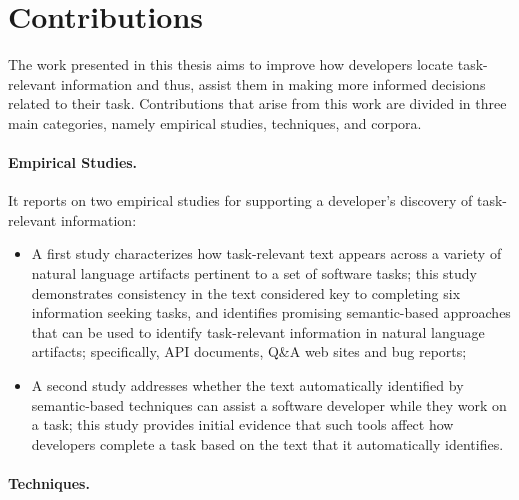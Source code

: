 

\section{Contributions}
\label{cp1:contributions}


The work presented in this thesis 
aims to improve how developers locate task-relevant information and thus, assist them in making more informed decisions related to their task.
Contributions that arise from this work are divided in three main categories, namely 
empirical studies, techniques, and corpora.




\paragraph{\textbf{Empirical Studies.}} 

It reports on two empirical studies for supporting a developer's discovery of task-relevant information:

\begin{itemize}

    \item A first study characterizes how task-relevant text appears across a variety of natural language artifacts pertinent to a set of software tasks; this study demonstrates consistency in the text 
    considered key to completing six information seeking tasks, and identifies 
    promising semantic-based approaches that can be used to identify task-relevant information in natural language artifacts; specifically, API documents, Q\&A web sites and bug reports; 

    \item A second study addresses whether 
    the text automatically identified by semantic-based techniques can assist a software developer while they work on a task; this study provides initial evidence that such tools affect how developers complete a task 
    based on the text that it automatically identifies.
\end{itemize}




\paragraph{\textbf{Techniques.}} 

